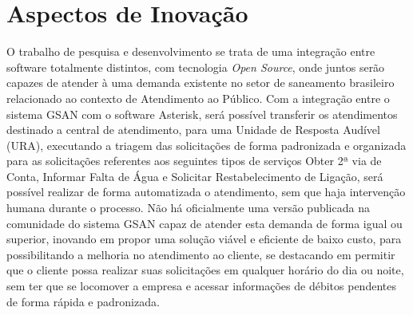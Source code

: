 \section{Aspectos de Inovação}
O trabalho de pesquisa e desenvolvimento se trata de uma integração entre software totalmente distintos, com tecnologia \textit{Open Source}, onde juntos serão capazes de atender à uma demanda existente no setor de saneamento brasileiro relacionado ao contexto de Atendimento ao Público. Com a integração entre o sistema GSAN com o software Asterisk, será possível transferir os atendimentos destinado a central de atendimento, para uma Unidade de Resposta Audível (URA), executando a triagem das solicitações de forma padronizada e organizada para as solicitações referentes aos seguintes tipos de serviços Obter 2ª via de Conta, Informar Falta de Água e Solicitar Restabelecimento de Ligação, será possível realizar de forma automatizada o atendimento, sem que haja intervenção humana durante o processo. 
Não há oficialmente uma versão publicada na comunidade do sistema GSAN capaz de atender esta demanda de forma igual ou superior, inovando em propor uma solução viável e eficiente de baixo custo, para possibilitando a melhoria no atendimento ao cliente, se destacando em permitir que o cliente possa realizar suas solicitações em qualquer horário do dia ou noite, sem ter que se locomover a empresa e acessar informações de débitos pendentes de forma rápida e padronizada.
